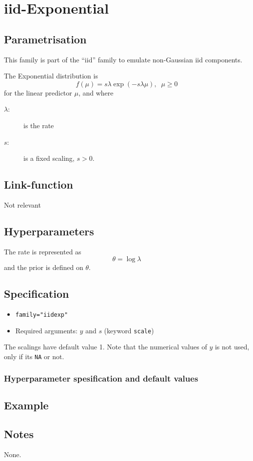 \documentclass[a4paper,11pt]{article}
\begin{document}
\section*{iid-Exponential}

\subsection*{Parametrisation}

This family is part of the ``iid'' family to emulate non-Gaussian iid
components.


The Exponential distribution is
\begin{displaymath}
    f(\mu) = s\lambda \exp(-s\lambda \mu), \;\; \mu\ge 0
\end{displaymath}
for the linear predictor $\mu$, and where
\begin{description}
\item[$\lambda$:] is the rate
\item[$s$:] is a fixed scaling, $s>0$.    
\end{description}

\subsection*{Link-function}

Not relevant

\subsection*{Hyperparameters}

The rate is represented as
\begin{displaymath}
    \theta = \log \lambda
\end{displaymath}
and the prior is defined on $\theta$. 

\subsection*{Specification}

\begin{itemize}
\item \texttt{family="iidexp"}
\item Required arguments: $y$ and $s$ (keyword \texttt{scale})
\end{itemize}
The scalings have default value 1. Note that the numerical values of
$y$ is not used, only if its \texttt{NA} or not. 

\subsubsection*{Hyperparameter spesification and default values}




\subsection*{Example}



\subsection*{Notes}

None.
\end{document}
